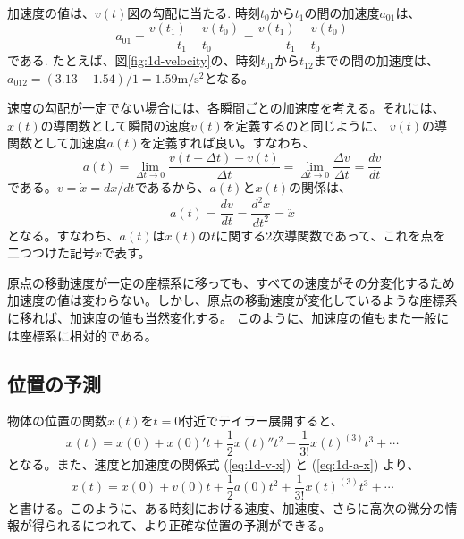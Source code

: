 \documentclass[a4paper, uplatex]{jsarticle}
\begin{document}
加速度の値は、\(v(t)\)図の勾配に当たる. 時刻\(t_0\)から\(t_1\)の間の加速度\(a_{01}\)は、
\begin{equation}
  a_{01} = \frac{v(t_1) - v(t_0)}{t_1 - t_0} = \frac{v(t_1) - v(t_0)}{t_1 - t_0}
  \label{eq:1d-acceleration}
\end{equation}
である. たとえば、図\ref{fig:1d-velocity}の、時刻\(t_{01}\)から\(t_{12}\)までの間の加速度は、
\(a_{012} = (3.13 - 1.54)/1 = 1.59\mathrm{m/s^2}\)となる。

速度の勾配が一定でない場合には、各瞬間ごとの加速度を考える。それには、\(x(t)\)の導関数として瞬間の速度\(v(t)\)を定義するのと同じように、
\(v(t)\)の導関数として加速度\(a(t)\)を定義すれば良い。すなわち、
\begin{equation}
  a(t) = \lim_{\Delta t \to 0} \frac{v(t + \Delta t) - v(t)}{\Delta t} = \lim_{\Delta t \to 0} \frac{\Delta v}{\Delta t} = \frac{dv}{dt}
  \label{eq:1d-acceleration-function}
\end{equation}
である。\(v=\dot{x}=dx/dt\)であるから、\(a(t)\)と\(x(t)\)の関係は、
\begin{equation}
  a(t) = \frac{dv}{dt} = \frac{d^2x}{dt^2} = \ddot{x}
  \label{eq:1d-a-x}
\end{equation}
となる。すなわち、\(a(t)\)は\(x(t)\)の\(t\)に関する2次導関数であって、これを点を二つつけた記号\(\ddot{x}\)で表す。

原点の移動速度が一定の座標系に移っても、すべての速度がその分変化するため加速度の値は変わらない。しかし、原点の移動速度が変化しているような座標系に移れば、加速度の値も当然変化する。
このように、加速度の値もまた一般には座標系に相対的である。

\subsection{位置の予測}
物体の位置の関数\(x(t)\)を\(t=0\)付近でテイラー展開すると、
\begin{equation}
  x(t) = x(0) + x(0)'t + \frac{1}{2}x(t)''t^2 + \frac{1}{3!}x(t)^{(3)}t^3 + \cdots
  \label{eq:1d-taylor}
\end{equation}
となる。また、速度と加速度の関係式 (\ref{eq:1d-v-x}) と (\ref{eq:1d-a-x}) より、
\begin{equation}
  x(t) = x(0) + v(0)t + \frac{1}{2}a(0)t^2 + \frac{1}{3!}x(t)^{(3)}t^3 + \cdots
  \label{eq:1d-taylor-2}
\end{equation}
と書ける。このように、ある時刻における速度、加速度、さらに高次の微分の情報が得られるにつれて、より正確な位置の予測ができる。
\end{document}
